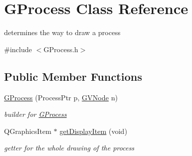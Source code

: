 \hypertarget{class_g_process}{\section{\-G\-Process \-Class \-Reference}
\label{class_g_process}
}


determines the way to draw a process  




{\ttfamily \#include $<$\-G\-Process.\-h$>$}

\subsection*{\-Public \-Member \-Functions}
\begin{DoxyCompactItemize}
\item 
\hyperlink{class_g_process_a16ff7286ec7b0081a6d2a25f9784460f}{\-G\-Process} (\-Process\-Ptr p, \hyperlink{struct_g_v_node}{\-G\-V\-Node} n)
\begin{DoxyCompactList}\small\item\em builder for \hyperlink{class_g_process}{\-G\-Process} \end{DoxyCompactList}\item 
\-Q\-Graphics\-Item $\ast$ \hyperlink{class_g_process_abc8cdf8bb0a8402a1b507005be3a97f9}{get\-Display\-Item} (void)
\begin{DoxyCompactList}\small\item\em getter for the whole drawing of the process \end{DoxyCompactList}\end{DoxyCompactItemize}
